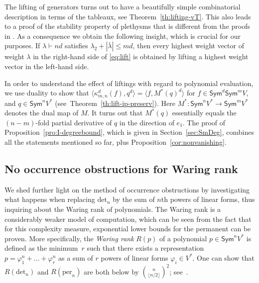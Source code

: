 \documentclass[11pt]{amsart}
\def\det{\mathrm{det}}
\def\per{\mathrm{per}}
\def\Sym{\mathsf{Sym}}
\def\la{\lambda}
\def\ot{\otimes}
\numberwithin{equation}{section}
\begin{document}
The lifting of generators turns out to have a beautifully simple combinatorial description in terms 
of the tableaux, see Theorem~\ref{th:lifting-vT}. 
This also leads to a proof of the stability property of plethysms that is  
different from the proofs in \cite{wei:90,carre-thibon:92}.
As a consequence we obtain the following insight, which is crucial for our purposes. 
If $\la\vdash nd$ satisfies $\la_2 + |\bar \la| \le md$, then every 
highest weight vector of weight $\la$ in the right-hand side of \eqref{eq:lift} 
is obtained by lifting a highest weight vector in the left-hand side.

In order to understand the effect of liftings with regard to polynomial evaluation, 
we use duality to show that
$\big\langle\kappa^d_{m,n}(f), q^{d} \big\rangle = \big\langle f, M^*(q)^{d}\big\rangle$ 
for $f\in\Sym^d\Sym^m V$, and $q\in\Sym^n V^*$
(see\ Theorem~\ref{th:lift-ip-preserv}). 
Here $M^*\colon\Sym^n V^* \to \Sym^m V^*$ denotes the dual map of $M$. 
It turns out that $M^*(q)$ essentially 
equals the $(n-m)$-fold partial derivative of $q$ in the direction of $e_1$. 
The proof of Proposition~\ref{pro:I-degreebound}, 
which is given in Section~\ref{sec:SmDeg}, 
combines all the statements mentioned so far, plus 
Proposition~\ref{cor:nonvanishing}. 


\subsection{No occurrence obstructions for Waring rank}




We shed further light on the method of occurrence obstructions by investigating what happens
when replacing $\det_n$ by the sum of $n$th powers of linear forms, thus inquiring about the 
Waring rank of polynomials. The Waring rank is a 
considerably weaker model of computation, which can be seen from the fact 
that for this complexity measure, exponential lower bounds for the permanent can be proven. 
More specifically, the {\em Waring rank} $R(p)$ 
of a polynomial $p\in \Sym^n V^*$ is defined 
as the minimum~$r$ such that there exists a representation 
$p=\varphi^n_1+\ldots + \varphi^n_r$ as a sum of $r$ powers of linear forms $\varphi_i\in V^*$. 
One can show that $R(\det_n)$ and $R(\per_n)$ are both below by ${n\choose \lfloor n/2\rfloor}^2$; 
see~\cite{landsberg-teitler:10}. %
\end{document}

